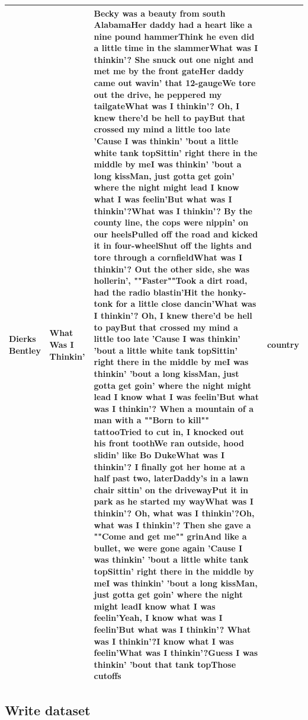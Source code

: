 \documentclass[
  letterpaper,
]{scrbook}
\begin{document}
\begin{table}
\begin{tabular}{llll}
Dierks Bentley & What Was I Thinkin' & Becky was a beauty from south AlabamaHer daddy had a heart like a nine pound hammerThink he even did a little time in the slammerWhat was I thinkin'? She snuck out one night and met me by the front gateHer daddy came out wavin' that 12-gaugeWe tore out the drive, he peppered my tailgateWhat was I thinkin'? Oh, I knew there'd be hell to payBut that crossed my mind a little too late 'Cause I was thinkin' 'bout a little white tank topSittin' right there in the middle by meI was thinkin' 'bout a long kissMan, just gotta get goin' where the night might lead I know what I was feelin'But what was I thinkin'?What was I thinkin'? By the county line, the cops were nippin' on our heelsPulled off the road and kicked it in four-wheelShut off the lights and tore through a cornfieldWhat was I thinkin'? Out the other side, she was hollerin', ""Faster""Took a dirt road, had the radio blastin'Hit the honky-tonk for a little close dancin'What was I thinkin'? Oh, I knew there'd be hell to payBut that crossed my mind a little too late 'Cause I was thinkin' 'bout a little white tank topSittin' right there in the middle by meI was thinkin' 'bout a long kissMan, just gotta get goin' where the night might lead I know what I was feelin'But what was I thinkin'? When a mountain of a man with a ""Born to kill"" tattooTried to cut in, I knocked out his front toothWe ran outside, hood slidin' like Bo DukeWhat was I thinkin'? I finally got her home at a half past two, laterDaddy's in a lawn chair sittin' on the drivewayPut it in park as he started my wayWhat was I thinkin'? Oh, what was I thinkin'?Oh, what was I thinkin'? Then she gave a ""Come and get me"" grinAnd like a bullet, we were gone again 'Cause I was thinkin' 'bout a little white tank topSittin' right there in the middle by meI was thinkin' 'bout a long kissMan, just gotta get goin' where the night might leadI know what I was feelin'Yeah, I know what was I feelin'But what was I thinkin'? What was I thinkin'?I know what I was feelin'What was I thinkin'?Guess I was thinkin' 'bout that tank topThose cutoffs & country\\
\bottomrule
\end{tabular}
\end{table}

\hypertarget{write-dataset-1}{%
\subsection{Write dataset}\label{write-dataset-1}}
\end{document}
